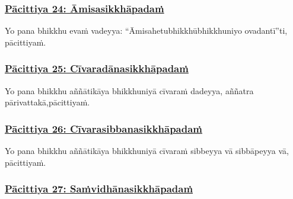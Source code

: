 \subsubsection*{\hyperref[exp24]{Pācittiya 24: Āmisasikkhāpadaṁ}}
\label{pac24}

Yo pana bhikkhu evaṁ vadeyya: ``Āmisahetu\makeatletter\hyperlink{endnote268-appendix}\makeatother \thinspace  bhikkhū\makeatletter\hyperlink{endnote269-appendix}\makeatother \thinspace bhikkhuniyo ovadantī''ti, pācittiyaṁ.



\subsubsection*{\hyperref[exp25]{Pācittiya 25: Cīvaradānasikkhāpadaṁ}}
\label{pac25}

Yo pana bhikkhu aññātikāya bhikkhuniyā cīvaraṁ dadeyya, aññatra pārivattakā,\makeatletter\hyperlink{endnote270-appendix}\makeatother \thinspace pācittiyaṁ.



\subsubsection*{\hyperref[exp26]{Pācittiya 26: Cīvarasibbanasikkhāpadaṁ}}
\label{pac26}

Yo pana bhikkhu aññātikāya bhikkhuniyā cīvaraṁ sibbeyya vā sibbāpeyya vā, pācittiyaṁ.



\subsubsection*{\hyperref[exp27]{Pācittiya 27: Saṁvidhānasikkhāpadaṁ}}
\label{pac27}

